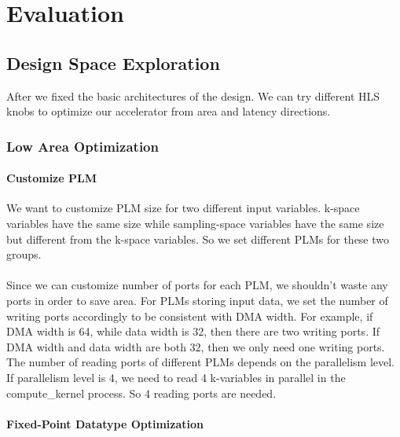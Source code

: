 \section{Evaluation}

\subsection{Design Space Exploration}

After we fixed the basic architectures of the design. We can try different HLS
knobs to optimize our accelerator from area and latency directions. \\

\subsubsection{Low Area Optimization}

\paragraph{Customize PLM}

We want to customize PLM size for two different input variables. k-space
variables have the same size while sampling-space variables have the same size
but different from the k-space variables. So we set different PLMs for these two
groups. \\ \\ Since we can customize number of ports for each PLM, we shouldn't
waste any ports in order to save area. For PLMs storing input data, we set the
number of writing ports accordingly to be consistent with DMA width. For
example, if DMA width is 64, while data width is 32, then there are two writing
ports. If DMA width and data width are both 32, then we only need one writing
ports. The number of reading ports of different PLMs depends on the parallelism
level. If parallelism level is 4, we need to read 4 k-variables in parallel in
the compute\_kernel process. So 4 reading ports are needed.\\

\paragraph{Fixed-Point Datatype Optimization}

